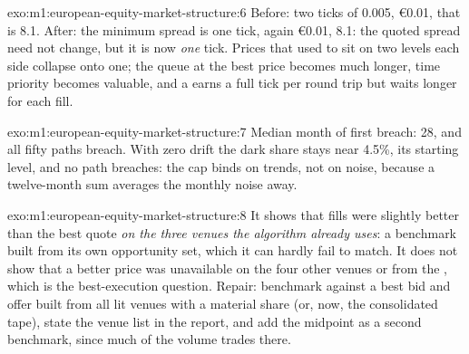 \begin{solution}{exo:m1:european-equity-market-structure:6}
Before: two ticks of 0.005, \euro 0.01, that is \qty{8.1}{\bp}. After: the
minimum spread is one tick, again \euro 0.01, \qty{8.1}{\bp}: the quoted
spread need not change, but it is now \emph{one} tick. Prices that used to
sit on two levels each side collapse onto one; the queue at the best price
becomes much longer, time priority becomes valuable, and a 
earns a full tick per round trip but waits longer for each fill.
\end{solution}

\begin{solution}{exo:m1:european-equity-market-structure:7}
Median month of first breach: 28, and all fifty paths breach. With zero
drift the dark share stays near 4.5\%, its starting level, and no path
breaches: the cap binds on trends, not on noise, because a twelve-month sum
averages the monthly noise away.
\end{solution}

\begin{solution}{exo:m1:european-equity-market-structure:8}
It shows that fills were slightly better than the best quote \emph{on the
three venues the algorithm already uses}: a benchmark built from its own
opportunity set, which it can hardly fail to match. It does not show that a
better price was unavailable on the four other venues or from the , which is the best-execution question. Repair: benchmark
against a best bid and offer built from all lit venues with a material share
(or, now, the consolidated tape), state the venue list in the report, and
add the midpoint as a second benchmark, since much of the volume trades
there.
\end{solution}

